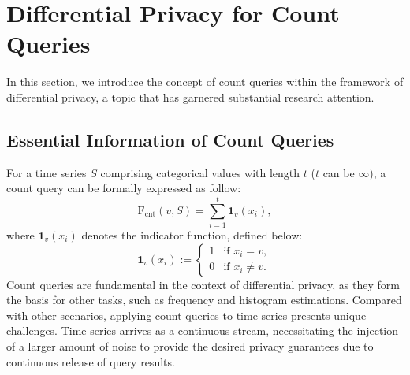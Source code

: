 \section{Differential Privacy for Count Queries }\label{sec3}
In this section, we introduce the concept of count queries within the framework of differential privacy,  a topic that has garnered substantial research attention.

\subsection{Essential Information of Count Queries}
For a time series $S$ comprising categorical values with length $t$ ($t$ can be $\infty$), a count query can be formally expressed as follow:
\begin{equation}\nonumber
	\mathrm{F}_{\mathrm{cnt}}(v, S)=\sum_{i=1}^{t}\mathbf{1}_v(x_i),
\end{equation}
where $\mathbf{1}_v(x_i)$ denotes the indicator function, defined below:
\begin{equation}\nonumber
	\mathbf{1}_v(x_i) :=
	\begin{cases} 
		1 & \text{if } x_i=v, \\
		0 & \text{if } x_i \ne v.
	\end{cases}
\end{equation}
Count queries are fundamental in the context of differential privacy, as they form the basis for other tasks, such as frequency and histogram estimations. 
 Compared with other scenarios, applying count queries to time series presents unique challenges. Time series arrives as a continuous stream, necessitating the injection of a larger amount of noise to provide the desired privacy guarantees due to continuous release of query results. 
 


